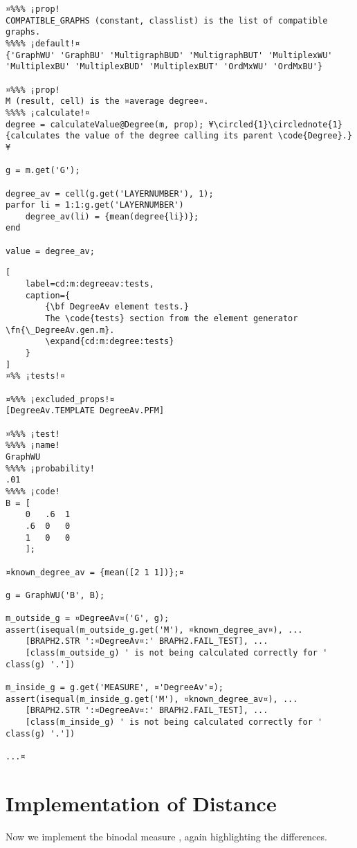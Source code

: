 \documentclass{tufte-handout}
\begin{document}
\begin{lstlisting}
¤%%% ¡prop!
COMPATIBLE_GRAPHS (constant, classlist) is the list of compatible graphs.
%%%% ¡default!¤
{'GraphWU' 'GraphBU' 'MultigraphBUD' 'MultigraphBUT' 'MultiplexWU' 'MultiplexBU' 'MultiplexBUD' 'MultiplexBUT' 'OrdMxWU' 'OrdMxBU'}

¤%%% ¡prop!
M (result, cell) is the ¤average degree¤.
%%%% ¡calculate!¤
degree = calculateValue@Degree(m, prop); ¥\circled{1}\circlednote{1}{calculates the value of the degree calling its parent \code{Degree}.}¥

g = m.get('G');

degree_av = cell(g.get('LAYERNUMBER'), 1);
parfor li = 1:1:g.get('LAYERNUMBER')
    degree_av(li) = {mean(degree{li})};
end

value = degree_av;
\end{lstlisting}

\begin{lstlisting}[
	label=cd:m:degreeav:tests,
	caption={
		{\bf DegreeAv element tests.}
		The \code{tests} section from the element generator \fn{\_DegreeAv.gen.m}.
		\expand{cd:m:degree:tests}
	}
]
¤%% ¡tests!¤

¤%%% ¡excluded_props!¤
[DegreeAv.TEMPLATE DegreeAv.PFM]

¤%%% ¡test!
%%%% ¡name!
GraphWU
%%%% ¡probability!
.01
%%%% ¡code!
B = [
    0   .6  1
    .6  0   0
    1   0   0
    ];

¤known_degree_av = {mean([2 1 1])};¤

g = GraphWU('B', B);

m_outside_g = ¤DegreeAv¤('G', g);
assert(isequal(m_outside_g.get('M'), ¤known_degree_av¤), ...
    [BRAPH2.STR ':¤DegreeAv¤:' BRAPH2.FAIL_TEST], ...
    [class(m_outside_g) ' is not being calculated correctly for ' class(g) '.'])

m_inside_g = g.get('MEASURE', ¤'DegreeAv'¤);
assert(isequal(m_inside_g.get('M'), ¤known_degree_av¤), ...
    [BRAPH2.STR ':¤DegreeAv¤:' BRAPH2.FAIL_TEST], ...
    [class(m_inside_g) ' is not being calculated correctly for ' class(g) '.'])

...¤
\end{lstlisting}

\clearpage
\section{Implementation of Distance}

Now we implement the binodal measure , again highlighting the differences.
\end{document}
